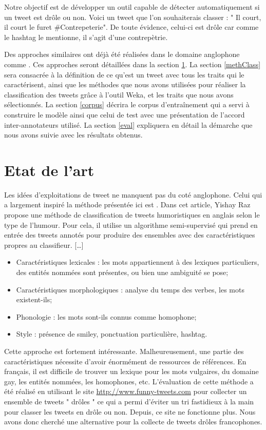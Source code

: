 \documentclass[10pt,a4paper,twoside]{article}
\begin{document}
Notre objectif est de développer un outil capable de détecter automatiquement si un tweet est drôle ou non. Voici un tweet que l’on souhaiterais classer : " Il court, il court le furet \#Contrepeterie".  De toute évidence, celui-ci est drôle car comme le hashtag le mentionne, il s'agit d'une contrepètrie. 

Des approches similaires ont déjà été réalisées dans le domaine anglophone comme \cite{Raz12, Barbosa2010}. Ces approches seront détaillées dans la section \ref{art}. La section \ref{methClass} sera consacrée à la définition de ce qu'est un tweet avec tous les traits qui le caractérisent, ainsi que les méthodes que nous avons utilisées pour réaliser la classification des tweets grâce à l'outil Weka, et les traits que nous avons sélectionnés. La section \ref{corpus} décrira le corpus d'entraînement qui a servi à construire le modèle ainsi que celui de test avec une présentation de l'accord inter-annotateurs utilisé. La section \ref{eval} expliquera en détail la démarche que nous avons suivie avec les résultats obtenus.




\section{Etat de l'art}
\label{art}
Les idées d’exploitations de tweet ne manquent pas du coté anglophone. Celui qui a largement inspiré la méthode présentée ici est \cite{Raz12}.  Dans cet article, Yishay Raz propose une méthode de classification de tweets humoristiques en anglais selon le type de l’humour. Pour cela, il utilise un algorithme semi-supervisé qui prend en entrée des tweets annotés pour produire des ensembles avec des caractéristiques propres au classifieur.  […]

\begin{itemize}
\item Caractéristiques lexicales : les mots appartiennent à des lexiques particuliers, des entités nommées sont présentes, ou bien une ambiguité se pose;
\item Caractéristiques morphologiques : analyse du temps des verbes, les mots existent-ils;
\item Phonologie : les mots sont-ils connus comme homophone;
\item Style : présence de smiley, ponctuation particulière, hashtag.
\end{itemize}
Cette approche est fortement intéressante. Malheureusement, une partie des caractéristiques nécessite d’avoir énormément de ressources de références. En français, il est difficile de trouver un lexique pour les mots vulgaires, du domaine gay, les entités nommées, les homophones, etc. 
L’évaluation de cette méthode a été réalisé en utilisant le site \url{ http://www.funny-tweets.com} pour collecter un ensemble de tweets " drôles " ce qui a permi d’éviter un tri fastidieux à la main pour classer les tweets en drôle ou non. Depuis, ce site ne fonctionne plus. Nous avons donc cherché une alternative pour la collecte de tweets drôles francophones.
\end{document}
